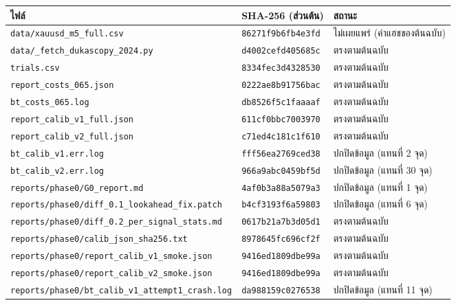 {\scriptsize
\begin{longtable}{@{}>{\raggedright\arraybackslash}p{8.6cm}p{2.7cm}>{\raggedright\arraybackslash}p{3.4cm}@{}}
\toprule
ไฟล์ & SHA-256 (ส่วนต้น) & สถานะ \\
\midrule
\endhead
\texttt{data/\allowbreak{}xauusd\_m5\_full.csv} & \texttt{86271f9b6fb4e3fd} & ไม่เผยแพร่ (ค่าแฮชของต้นฉบับ) \\
\texttt{data/\allowbreak{}\_fetch\_dukascopy\_2024.py} & \texttt{d4002cefd405685c} & ตรงตามต้นฉบับ \\
\texttt{trials.csv} & \texttt{8334fec3d4328530} & ตรงตามต้นฉบับ \\
\texttt{report\_costs\_065.json} & \texttt{0222ae8b91756bac} & ตรงตามต้นฉบับ \\
\texttt{bt\_costs\_065.log} & \texttt{db8526f5c1faaaaf} & ตรงตามต้นฉบับ \\
\texttt{report\_calib\_v1\_full.json} & \texttt{611cf0bbc7003970} & ตรงตามต้นฉบับ \\
\texttt{report\_calib\_v2\_full.json} & \texttt{c71ed4c181c1f610} & ตรงตามต้นฉบับ \\
\texttt{bt\_calib\_v1.err.log} & \texttt{fff56ea2769ced38} & ปกปิดข้อมูล (แทนที่ 2 จุด) \\
\texttt{bt\_calib\_v2.err.log} & \texttt{966a9abc0459bf5d} & ปกปิดข้อมูล (แทนที่ 30 จุด) \\
\texttt{reports/\allowbreak{}phase0/\allowbreak{}G0\_report.md} & \texttt{4af0b3a88a5079a3} & ปกปิดข้อมูล (แทนที่ 1 จุด) \\
\texttt{reports/\allowbreak{}phase0/\allowbreak{}diff\_0.1\_lookahead\_fix.patch} & \texttt{b4cf3193f6a59803} & ปกปิดข้อมูล (แทนที่ 6 จุด) \\
\texttt{reports/\allowbreak{}phase0/\allowbreak{}diff\_0.2\_per\_signal\_stats.md} & \texttt{0617b21a7b3d05d1} & ตรงตามต้นฉบับ \\
\texttt{reports/\allowbreak{}phase0/\allowbreak{}calib\_json\_sha256.txt} & \texttt{8978645fc696cf2f} & ตรงตามต้นฉบับ \\
\texttt{reports/\allowbreak{}phase0/\allowbreak{}report\_calib\_v1\_smoke.json} & \texttt{9416ed1809dbe99a} & ตรงตามต้นฉบับ \\
\texttt{reports/\allowbreak{}phase0/\allowbreak{}report\_calib\_v2\_smoke.json} & \texttt{9416ed1809dbe99a} & ตรงตามต้นฉบับ \\
\texttt{reports/\allowbreak{}phase0/\allowbreak{}bt\_calib\_v1\_attempt1\_crash.log} & \texttt{da988159c0276538} & ปกปิดข้อมูล (แทนที่ 11 จุด) \\

\end{longtable}}
